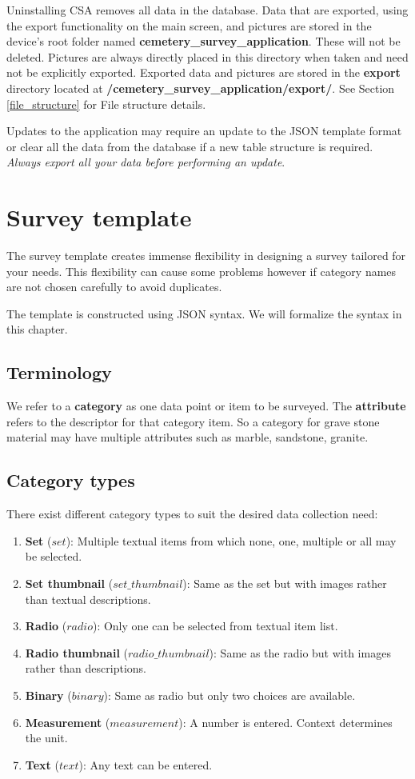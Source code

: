\documentclass{scrreprt}
\begin{document}
Uninstalling CSA removes all data in the database. Data that are exported, using the export functionality on the main screen, and pictures are stored in the device's root folder named \textbf{cemetery_survey_application}. These will not be deleted. Pictures are always directly placed in this directory when taken and need not be explicitly exported. Exported data and pictures are stored in the \textbf{export} directory located at \textbf{/cemetery_survey_application/export/}. See Section \ref{file_structure} for File structure details.

Updates to the application may require an update to the JSON template format or clear all the data from the database if a new table structure is required. \textit{Always export all your data before performing an update}.

\chapter{Survey template}
The survey template creates immense flexibility in designing a survey tailored for your needs. This flexibility can cause some problems however if category names are not chosen carefully to avoid duplicates.

The template is constructed using JSON syntax. We will formalize the syntax in this chapter.

\section{Terminology}
We refer to a \textbf{category} as one data point or item to be surveyed. The \textbf{attribute} refers to the descriptor for that category item. So a category for grave stone material may have multiple attributes such as marble, sandstone, granite.

\section{Category types}
\label{category_types}
There exist different category types to suit the desired data collection need:

\begin{enumerate}
\item \textbf{Set} ($set$): Multiple textual items from which none, one, multiple or all may be selected.
\item \textbf{Set thumbnail} ($set\_thumbnail$): Same as the set but with images rather than textual descriptions.
\item \textbf{Radio} ($radio$): Only one can be selected from textual item list.
\item \textbf{Radio thumbnail} ($radio\_thumbnail$): Same as the radio but with images rather than descriptions.
\item \textbf{Binary} ($binary$): Same as radio but only two choices are available.
\item \textbf{Measurement} ($measurement$): A number is entered. Context determines the unit.
\item \textbf{Text} ($text$): Any text can be entered.
\end{enumerate}
\end{document}
